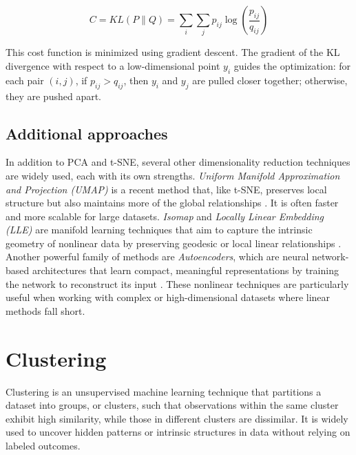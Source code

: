 \documentclass[conference]{IEEEtran}
\begin{document}
\[
C = KL(P \| Q) = \sum_{i} \sum_{j} p_{ij} \log \left( \frac{p_{ij}}{q_{ij}} \right)
\]



This cost function is minimized using gradient descent. The gradient of the KL divergence with respect to a low-dimensional point \( y_i \) guides the optimization: for each pair \( (i, j) \), if \( p_{ij} > q_{ij} \), then \( y_i \) and \( y_j \) are pulled closer together; otherwise, they are pushed apart.


\subsection{Additional approaches}
In addition to PCA and t-SNE, several other dimensionality reduction techniques are widely used, each with its own strengths. \textit{Uniform Manifold Approximation and Projection (UMAP)} is a recent method that, like t-SNE, preserves local structure but also maintains more of the global relationships \cite{umap}. It is often faster and more scalable for large datasets. \textit{Isomap} and \textit{Locally Linear Embedding (LLE)} are manifold learning techniques that aim to capture the intrinsic geometry of nonlinear data by preserving geodesic or local linear relationships \cite{isomap, LLE}. Another powerful family of methods are \textit{Autoencoders}, which are neural network-based architectures that learn compact, meaningful representations by training the network to reconstruct its input \cite{autoencoder}. These nonlinear techniques are particularly useful when working with complex or high-dimensional datasets where linear methods fall short. 


\section{Clustering}
Clustering is an unsupervised machine learning technique that partitions a dataset into groups, or clusters, such that observations within the same cluster exhibit high similarity, while those in different clusters are dissimilar. It is widely used to uncover hidden patterns or intrinsic structures in data without relying on labeled outcomes. %
\end{document}
